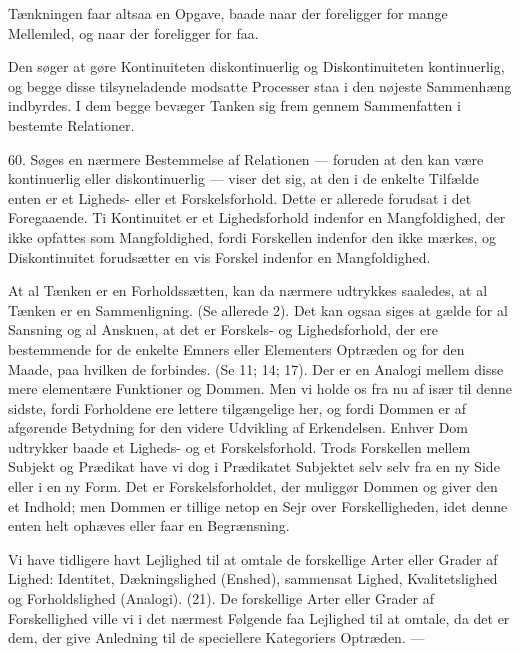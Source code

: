 \documentclass[12pt,a4paper]{book}
\newcommand{\apage}[1]{\marginnote{\footnotesize\textit{[#1]}}}
\begin{document}
Tænkningen faar altsaa en Opgave, baade naar der foreligger for mange
Mellemled, og naar der foreligger for faa.

\apage{160} Den søger at gøre Kontinuiteten diskontinuerlig og Diskontinuiteten
kontinuerlig, og begge disse tilsyneladende modsatte Processer staa i den
nøjeste Sammenhæng indbyrdes. I dem begge bevæger Tanken sig frem gennem
Sammenfatten i bestemte Relationer.

60. Søges en nærmere Bestemmelse af Relationen --- foruden at den kan være
kontinuerlig eller diskontinuerlig --- viser det sig, at den i de enkelte
Tilfælde enten er et Ligheds- eller et Forskelsforhold. Dette er allerede
forudsat i det Foregaaende. Ti Kontinuitet er et Lighedsforhold indenfor en
Mangfoldighed, der ikke opfattes som Mangfoldighed, fordi Forskellen
indenfor den ikke mærkes, og Diskontinuitet forudsætter en vis Forskel
indenfor en Mangfoldighed.

At al Tænken er en Forholdssætten, kan da nærmere udtrykkes saaledes, at al
Tænken er en Sammenligning. (Se allerede 2). Det kan ogsaa siges at gælde
for al Sansning og al Anskuen, at det er Forskels- og Lighedsforhold, der ere
bestemmende for de enkelte Emners eller Elementers Optræden og for den
Maade, paa hvilken de forbindes. (Se 11; 14; 17). Der er en Analogi mellem
disse mere elementære Funktioner og Dommen. Men vi holde os fra nu af især
til denne sidste, fordi Forholdene ere lettere tilgængelige her, og fordi
Dommen er af afgørende Betydning for den videre Udvikling af Erkendelsen.
Enhver Dom udtrykker baade et Ligheds- og et Forskelsforhold. Trods
Forskellen mellem Subjekt og Prædikat have vi dog i Prædikatet Subjektet
selv selv fra en ny Side eller i en ny Form. Det er Forskelsforholdet, der
muliggør Dommen og giver den et Indhold; men Dommen er tillige netop en Sejr
over Forskelligheden, idet denne enten helt ophæves eller faar en
Begrænsning.

Vi have tidligere havt Lejlighed til at omtale de forskellige Arter eller
Grader af Lighed: Identitet, Dækningslighed (Enshed), sammensat Lighed,
Kvalitetslighed og Forholdslighed (Analogi). (21). De forskellige Arter eller
Grader af Forskellighed ville vi i det nærmest Følgende faa \apage{161}
Lejlighed til at omtale, da det er dem, der give Anledning til de speciellere
Kategoriers Optræden. ---
\end{document}
